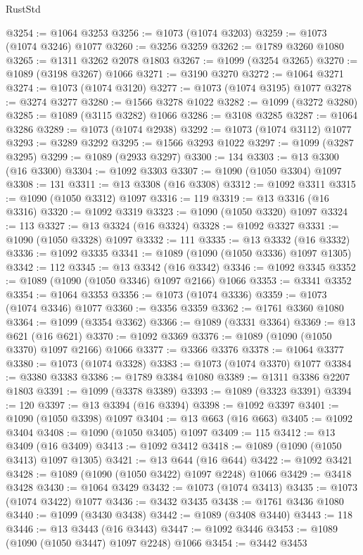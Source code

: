 \begin{lexlean}{RustStd}
\begin{coremodule}
@3254 := @1064 @3253
@3256 := @1073 (@1074 @3203)
@3259 := @1073 (@1074 @3246) @1077
@3260 := @3256 @3259
@3262 := @1789 @3260 @1080
@3265 := @1311 @3262 @2078 @1803
@3267 := @1099 (@3254 @3265)
@3270 := @1089 (@3198 @3267) @1066
@3271 := @3190 @3270
@3272 := @1064 @3271
@3274 := @1073 (@1074 @3120)
@3277 := @1073 (@1074 @3195) @1077
@3278 := @3274 @3277
@3280 := @1566 @3278 @1022
@3282 := @1099 (@3272 @3280)
@3285 := @1089 (@3115 @3282) @1066
@3286 := @3108 @3285
@3287 := @1064 @3286
@3289 := @1073 (@1074 @2938)
@3292 := @1073 (@1074 @3112) @1077
@3293 := @3289 @3292
@3295 := @1566 @3293 @1022
@3297 := @1099 (@3287 @3295)
@3299 := @1089 (@2933 @3297)
@3300 := 134
@3303 := @13 @3300 (@16 @3300)
@3304 := @1092 @3303
@3307 := @1090 (@1050 @3304) @1097
@3308 := 131
@3311 := @13 @3308 (@16 @3308)
@3312 := @1092 @3311
@3315 := @1090 (@1050 @3312) @1097
@3316 := 119
@3319 := @13 @3316 (@16 @3316)
@3320 := @1092 @3319
@3323 := @1090 (@1050 @3320) @1097
@3324 := 113
@3327 := @13 @3324 (@16 @3324)
@3328 := @1092 @3327
@3331 := @1090 (@1050 @3328) @1097
@3332 := 111
@3335 := @13 @3332 (@16 @3332)
@3336 := @1092 @3335
@3341 := @1089 (@1090 (@1050 @3336) @1097 @1305)
@3342 := 112
@3345 := @13 @3342 (@16 @3342)
@3346 := @1092 @3345
@3352 := @1089 (@1090 (@1050 @3346) @1097 @2166) @1066
@3353 := @3341 @3352
@3354 := @1064 @3353
@3356 := @1073 (@1074 @3336)
@3359 := @1073 (@1074 @3346) @1077
@3360 := @3356 @3359
@3362 := @1761 @3360 @1080
@3364 := @1099 (@3354 @3362)
@3366 := @1089 (@3331 @3364)
@3369 := @13 @621 (@16 @621)
@3370 := @1092 @3369
@3376 := @1089 (@1090 (@1050 @3370) @1097 @2166) @1066
@3377 := @3366 @3376
@3378 := @1064 @3377
@3380 := @1073 (@1074 @3328)
@3383 := @1073 (@1074 @3370) @1077
@3384 := @3380 @3383
@3386 := @1789 @3384 @1080
@3389 := @1311 @3386 @2207 @1803
@3391 := @1099 (@3378 @3389)
@3393 := @1089 (@3323 @3391)
@3394 := 120
@3397 := @13 @3394 (@16 @3394)
@3398 := @1092 @3397
@3401 := @1090 (@1050 @3398) @1097
@3404 := @13 @663 (@16 @663)
@3405 := @1092 @3404
@3408 := @1090 (@1050 @3405) @1097
@3409 := 115
@3412 := @13 @3409 (@16 @3409)
@3413 := @1092 @3412
@3418 := @1089 (@1090 (@1050 @3413) @1097 @1305)
@3421 := @13 @644 (@16 @644)
@3422 := @1092 @3421
@3428 := @1089 (@1090 (@1050 @3422) @1097 @2248) @1066
@3429 := @3418 @3428
@3430 := @1064 @3429
@3432 := @1073 (@1074 @3413)
@3435 := @1073 (@1074 @3422) @1077
@3436 := @3432 @3435
@3438 := @1761 @3436 @1080
@3440 := @1099 (@3430 @3438)
@3442 := @1089 (@3408 @3440)
@3443 := 118
@3446 := @13 @3443 (@16 @3443)
@3447 := @1092 @3446
@3453 := @1089 (@1090 (@1050 @3447) @1097 @2248) @1066
@3454 := @3442 @3453

\end{coremodule}
\end{lexlean}
